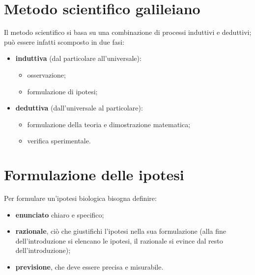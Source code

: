 \documentclass[10pt, draft]{book}
\begin{document}
\section{Metodo scientifico galileiano}
Il metodo scientifico si basa su una combinazione di processi induttivi e deduttivi; può essere infatti scomposto in due fasi:
\begin{itemize}
    \item \textbf{induttiva} (dal particolare all’universale):
    \begin{itemize}
        \item osservazione;
        \item formulazione di ipotesi;
    \end{itemize}
    \item \textbf{deduttiva} (dall’universale al particolare):
    \begin{itemize}
        \item formulazione della teoria e dimostrazione matematica;
        \item verifica sperimentale.
    \end{itemize}
\end{itemize}

\section{Formulazione delle ipotesi}
Per formulare un’ipotesi biologica bisogna definire:
\begin{itemize}
    \item \textbf{enunciato} chiaro e specifico;
    \item \textbf{razionale}, ciò che giustifichi l’ipotesi nella sua formulazione (alla fine dell’introduzione si elencano le ipotesi, il razionale si evince dal resto dell’introduzione);
    \item \textbf{previsione}, che deve essere precisa e misurabile.
\end{itemize}
\end{document}
